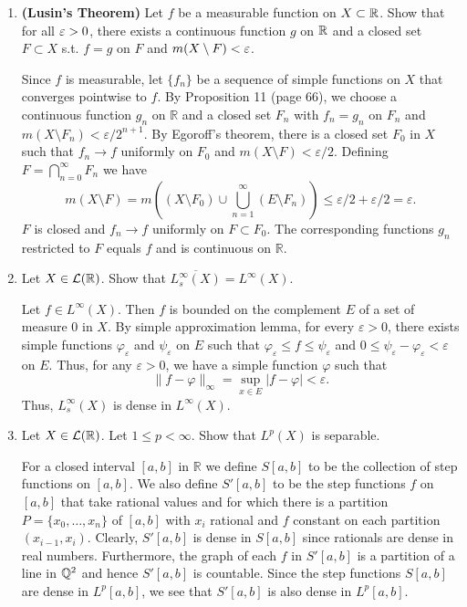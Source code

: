 \documentclass[12pt]{article}
\newcommand{\rl}{\mathbb{R}}
\begin{document}
\begin{enumerate}
    \item \textbf{(Lusin's Theorem)}
    Let $f$ be a measurable function on $X \subset \mathbb{R}$. Show that for all $\varepsilon> 0$, there exists a continuous function $g$ on $\mathbb{R}$ and a closed set $F \subset X$ s.t. $f=g$ on $F$ and $m(X \setminus F) < \varepsilon$. 
    \begin{mybox}
    Since $f$ is measurable, let $\{f_n\}$ be a sequence
    of simple functions on $X$ that converges pointwise
    to $f$. By Proposition 11 (page 66), we choose a
    continuous function $g_n$ on $\rl$ and a closed set
    $F_n$ with $f_n=g_n$ on $F_n$ and $m(X\setminus F_n)
    <\varepsilon/2^{n+1}$. By Egoroff's theorem,
    there is a closed set $F_0$ in $X$ such that
    $f_n\to f$ uniformly on $F_0$ and $m(X\setminus F)
    <\varepsilon/2$.
    Defining $F=\bigcap_{n=0}^\infty{F_n}$ we have
    $$m(X\setminus F)=m\left((X\setminus F_0)
    \cup\bigcup_{n=1}^\infty{(E\setminus F_n)}\right)
    \leq\varepsilon/2+\varepsilon/2=\varepsilon.$$
    $F$ is closed and $f_n\to f$ uniformly on $F\subset
    F_0$. The corresponding functions $g_n$ restricted 
    to $F$ equals $f$ and is continuous on $\rl$.
    \end{mybox}
    
    \item Let $X \in \mathcal{L}(\mathbb{R})$. Show that $ \overline{L^{\infty}_s(X)} = L^{\infty}(X)$.
    \begin{mybox}
        Let $f\in L^{\infty}(X)$. Then $f$ is
        bounded on the complement $E$ of a set of measure
        0 in $X$. By simple approximation lemma, for every
        $\varepsilon>0$, there
        exists simple functions $\varphi_\varepsilon$ and
        $\psi_\varepsilon$ on $E$ such that
        $\varphi_\varepsilon\leq f\leq\psi_\varepsilon$
        and $0\leq\psi_\varepsilon-\varphi_\varepsilon<
        \varepsilon$ on $E$. Thus, for any $\varepsilon>0$,
        we have a simple function $\varphi$
        such that
        $$\|f-\varphi\|_\infty=\sup_{x\in E}{|f-\varphi|}
        < \varepsilon.$$
        Thus, $L^{\infty}_s(X)$ is dense in $L^\infty(X)$.
    \end{mybox}

    \item Let $X \in \mathcal{L}(\mathbb{R})$. Let $1 \leq p < \infty$. Show that $L^p(X)$ is separable. 
    \begin{mybox}
        For a closed interval $[a,b]$ in $\rl$ we define
        $S[a,b]$ to be the collection of step functions
        on $[a,b]$. We also define $S'[a,b]$ to be the
        step functions $f$ on $[a,b]$ that take rational values
        and for which there is a partition $P=\{x_0,
        \ldots,x_n\}$ of $[a,b]$ with $x_i$ rational and
        $f$ constant on each partition $(x_{i-1},x_i)$.
        Clearly, $S'[a,b]$ is dense in $S[a,b]$ since
        rationals are dense in real numbers. Furthermore,
        the graph of each $f$ in $S'[a,b]$ is a
        partition of a line in $\mathbb{Q}^2$ and hence $S'[a,b]$
        is countable. Since the step functions $S[a,b]$
        are dense in $L^p[a,b]$, we see that
        $S'[a,b]$ is also dense in $L^p[a,b]$.


\end{mybox}
\end{enumerate}
\end{document}
